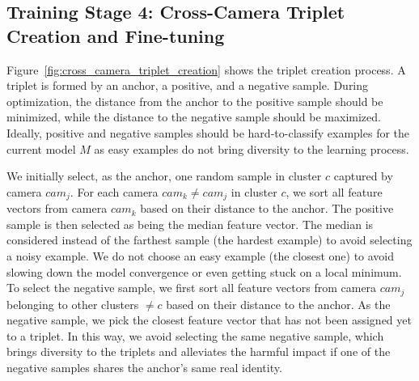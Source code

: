 \documentclass[journal]{IEEEtran}
\begin{document}
\subsection{Training Stage 4: Cross-Camera Triplet Creation and Fine-tuning}

Figure~\ref{fig:cross_camera_triplet_creation} shows the triplet creation process. A triplet is formed by an anchor, a positive, and a negative sample. 
During optimization, the distance from the anchor to the positive sample should be minimized, while the distance to the negative sample should be maximized. Ideally, positive and negative samples should be hard-to-classify examples for the current model $M$ as easy examples do not bring diversity to the learning process. 

We initially select, as the anchor, one random sample in cluster $c$ captured by camera ${cam}_j$. For each camera ${cam}_k \neq {cam}_j$ in cluster $c$, we sort all feature vectors from camera ${cam}_k$ based on their distance to the anchor. The positive sample is then selected as being the median feature vector. The median is considered instead of the farthest sample (the hardest example) to avoid selecting a noisy example. We do not choose an easy example (the closest one) to avoid slowing down the model convergence or even getting stuck on a local minimum.
To select the negative sample, we first sort all feature vectors from camera ${cam}_j$ belonging to other clusters $\neq c$ based on their distance to the anchor. As the negative sample, we pick the closest feature vector that has not been assigned yet to a triplet. In this way, we avoid selecting the same negative sample, which brings diversity to the triplets and alleviates the harmful impact if one of the negative samples shares the anchor's same real identity.
\end{document}
